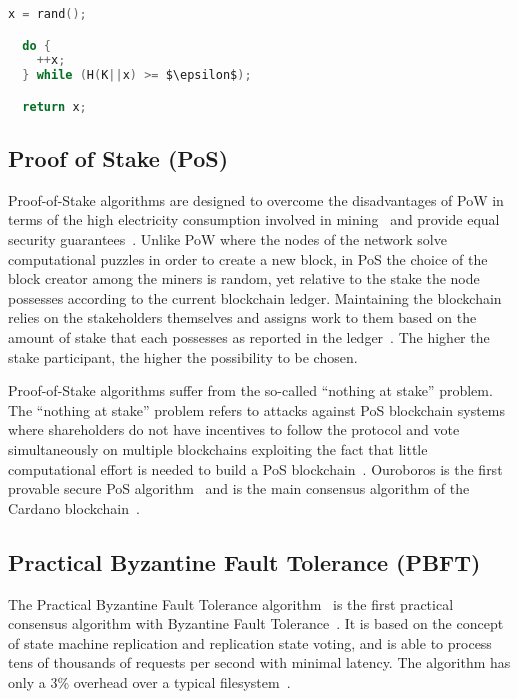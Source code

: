 \begin{lstlisting}[language=C, caption={A simple Proof-of-Work Algorithm}, mathescape=true]
  x = rand();

  do {
    ++x;
  } while (H(K||x) >= $\epsilon$);

  return x;
\end{lstlisting}

\subsection{Proof of Stake (PoS)}\label{blockchain:consensus:pos}

Proof-of-Stake algorithms are designed to overcome the disadvantages of PoW in terms of the high electricity consumption involved in mining~\cite{bl_consensus}
and provide equal security guarantees~\cite{Kiayias2017}. Unlike PoW where the nodes of the network solve computational puzzles in order to create a new block, in PoS the choice
of the block creator among the miners is random, yet relative to the stake the node possesses according to the current blockchain ledger. Maintaining
the blockchain relies on the stakeholders themselves and assigns work to them based on the amount of stake that each possesses as reported in the ledger~\cite{Kiayias2017}. The higher the stake participant, the higher the possibility to be chosen.

Proof-of-Stake algorithms suffer from the so-called “nothing at stake” problem. The “nothing at stake” problem refers to attacks against PoS blockchain systems where shareholders do not have
incentives to follow the protocol and vote simultaneously on multiple blockchains exploiting the fact that little computational effort
is needed to build a PoS blockchain~\cite{Kiayias2017}. Ouroboros is the first provable secure PoS algorithm~\cite{Kiayias2017} and is the main consensus algorithm of the Cardano blockchain~\cite{cardano_site}.

\subsection{Practical Byzantine Fault Tolerance (PBFT)}\label{blockchain:consensus:PBFT}

The Practical Byzantine Fault Tolerance algorithm~\cite{Castro:1999:PBF:296806.296824} is the first practical consensus algorithm with Byzantine Fault Tolerance~\cite{byzantine_fault_tolerance}.
It is based on the concept of state machine replication and replication state voting, and is able to process tens of thousands of requests per second with minimal latency.
The algorithm has only a 3\% overhead over a typical filesystem~\cite{Castro:1999:PBF:296806.296824}.


